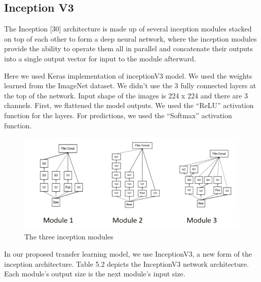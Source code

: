 \subsection{Inception V3}
The Inception [30] architecture is made up of several inception modules stacked on top of each other to form a deep neural network, where the inception modules provide the ability to operate them all in parallel and concatenate their outputs into a single output vector for input to the module afterward. 

\vspace{5mm}
Here we used Keras implementation of inceptionV3 model. We used the weights learned from the ImageNet dataset. We didn’t use the 3 fully connected layers at the top of the network. Input shape of the images is 224 x 224 and there are 3 channels. First, we flattened the model outputs. We used the “ReLU” activation function for the layers. For predictions, we used the “Softmax” activation function.

\vspace{5mm}
\begin{figure}[hbt!]
\centering
\includegraphics[scale=0.5]{images/fig-10.png}
\caption{The three inception modules}
\label{fig:x The three inception modules}
\end{figure}

\vspace{5mm}
In our proposed transfer learning model, we use InceptionV3, a new form of the inception architecture. Table 5.2 depicts the InceptionV3 network architecture. Each module's output size is the next module's input size. 

